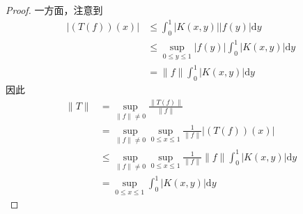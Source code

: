 \documentclass[lang = cn, scheme = chinese, thmcnt = section]{elegantbook}
\begin{document}
\begin{proof}
	一方面，注意到
	\begin{align*}
		|(T(f))(x)|&\le\int_0^1|K(x,y)||f(y)|\mathrm{d}y\\
		&\le\sup_{0\le y\le 1}|f(y)|\int_0^1|K(x,y)|\mathrm{d}y\\
		&=\|f\|\int_0^1|K(x,y)|\mathrm{d}y
	\end{align*}
	因此
	\begin{align*}
		\|T\|&=\sup_{\|f\|\ne0}\frac{\|T(f)\|}{\|f\|}\\
		&=\sup_{\|f\|\ne0}\sup_{0\le x\le 1}\frac{1}{\|f\|}|(T(f))(x)|\\
		&\le \sup_{\|f\|\ne0}\sup_{0\le x\le 1}\frac{1}{\|f\|} \|f\|\int_0^1|K(x,y)|\mathrm{d}y\\
		&=\sup_{0\le x\le 1}\int_0^1|K(x,y)|\mathrm{d}y
	\end{align*}


\end{proof}
\end{document}

